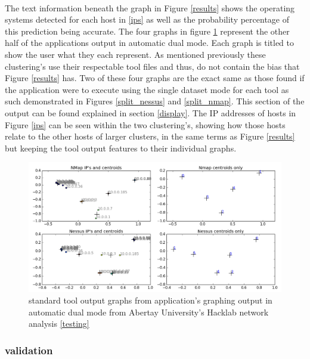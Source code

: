 \paragraph{}The text information beneath the graph in Figure \ref{results} shows the operating systems detected for each host in \ref{ips} as well as the probability percentage of this prediction being accurate. The four graphs in figure \ref{results2} represent the other half of the applications output in automatic dual mode. Each graph is titled to show the user what they each represent. As mentioned previously these clustering's use their respectable tool files and thus, do not contain the bias that Figure \ref{results} has. Two of these four graphs are the exact same as those found if the application were to execute using the single dataset mode for each tool as such demonstrated in Figures \ref{split_nessus} and \ref{split_nmap}. This section of the output can be found explained in section \ref{display}. The IP addresses of hosts in Figure \ref{ips} can be seen within the two clustering's, showing how those hosts relate to the other hosts of larger clusters, in the same terms as Figure \ref{results} but keeping the tool output features to their individual graphs.

\begin{figure}[!h]
\centering
\includegraphics[width=6in]{./Figures/results2.png}
\caption{standard tool output graphs from application's graphing output in automatic dual mode from Abertay University's Hacklab network analysis \ref{testing}}
\label{results2}
\end{figure}

\subsubsection{validation}

